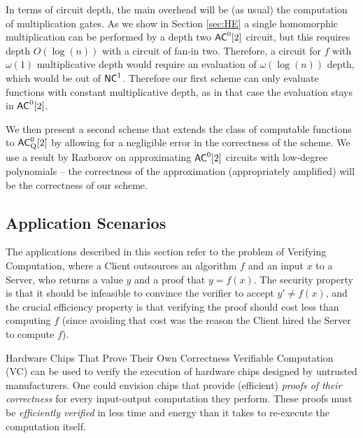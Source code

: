 In terms of circuit depth, the main overhead will be (as usual)
the computation of multiplication gates. As we 
 show in Section \ref{sec:HE} a single homomorphic multiplication can be performed by a depth two ${\mathsf{AC}}^0[2]$ circuit, but this requires depth $O(\log(n))$ with a circuit of fan-in two. Therefore, a circuit for $f$ with $\omega(1)$ multiplicative depth would require an evaluation of $\omega(\log(n))$ depth, which would be out of ${\mathsf{NC}}^1$. Therefore our first scheme can only evaluate
 functions with constant multiplicative depth, as in that case the evaluation stays in ${\mathsf{AC}}^0[2]$. 
 
We then present a second scheme that extends the class of computable functions 
to ${\mathsf{AC}}^0_{\text{Q}}[2]$ by allowing for a negligible error in the correctness of the scheme. We use a result by Razborov \cite{razborov1987lower} on approximating ${\mathsf{AC}}^0[2]$ circuits with low-degree polynomials -- the correctness of the approximation (appropriately amplified) will be the correctness of our scheme. 



\subsection{Application Scenarios}

The applications described in this section refer to the problem of Verifying Computation, where a Client outsources an algorithm $f$ and an input $x$ to a Server, who returns a value $y$ and a proof that $y=f(x)$. The security property is that it should be infeasible to convince the verifier to accept $y' \neq f(x)$, and the crucial efficiency property is that verifying the proof should cost less than computing $f$ (since avoiding that cost was the reason the Client hired the Server to compute $f$). 

\medskip
\noindent
{\sc Hardware Chips That Prove Their Own Correctness}
Verifiable Computation (VC) can be used to verify the execution of hardware chips designed by untrusted manufacturers. One could envision chips that provide (efficient) \emph{proofs of their correctness} for every input-output computation they perform. These proofs must be  \emph{efficiently verified} in less time and energy than it takes to re-execute the computation itself. 

